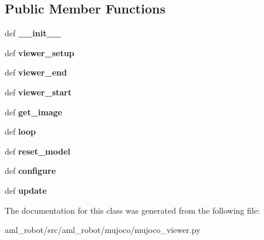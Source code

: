 \subsection*{Public Member Functions}
\begin{DoxyCompactItemize}
\item 
\hypertarget{classaml__robot_1_1mujoco_1_1mujoco__viewer_1_1_mujoco_viewer_abd60a1681f98dd324af2e72e9963d5e0}{def {\bfseries \-\_\-\-\_\-init\-\_\-\-\_\-}}\label{classaml__robot_1_1mujoco_1_1mujoco__viewer_1_1_mujoco_viewer_abd60a1681f98dd324af2e72e9963d5e0}

\item 
\hypertarget{classaml__robot_1_1mujoco_1_1mujoco__viewer_1_1_mujoco_viewer_ab5d6014fe4cac19369aca0a0fc1341b9}{def {\bfseries viewer\-\_\-setup}}\label{classaml__robot_1_1mujoco_1_1mujoco__viewer_1_1_mujoco_viewer_ab5d6014fe4cac19369aca0a0fc1341b9}

\item 
\hypertarget{classaml__robot_1_1mujoco_1_1mujoco__viewer_1_1_mujoco_viewer_a6fd6574d006fa00da91ee7de314f733f}{def {\bfseries viewer\-\_\-end}}\label{classaml__robot_1_1mujoco_1_1mujoco__viewer_1_1_mujoco_viewer_a6fd6574d006fa00da91ee7de314f733f}

\item 
\hypertarget{classaml__robot_1_1mujoco_1_1mujoco__viewer_1_1_mujoco_viewer_aea5aa6b0c0ffa605450bc1b484d6f376}{def {\bfseries viewer\-\_\-start}}\label{classaml__robot_1_1mujoco_1_1mujoco__viewer_1_1_mujoco_viewer_aea5aa6b0c0ffa605450bc1b484d6f376}

\item 
\hypertarget{classaml__robot_1_1mujoco_1_1mujoco__viewer_1_1_mujoco_viewer_a8df8939aa08c9a567c4ab57497482b21}{def {\bfseries get\-\_\-image}}\label{classaml__robot_1_1mujoco_1_1mujoco__viewer_1_1_mujoco_viewer_a8df8939aa08c9a567c4ab57497482b21}

\item 
\hypertarget{classaml__robot_1_1mujoco_1_1mujoco__viewer_1_1_mujoco_viewer_a87bdbcfd8cf3f55828f5ae8f5f27d9fb}{def {\bfseries loop}}\label{classaml__robot_1_1mujoco_1_1mujoco__viewer_1_1_mujoco_viewer_a87bdbcfd8cf3f55828f5ae8f5f27d9fb}

\item 
\hypertarget{classaml__robot_1_1mujoco_1_1mujoco__viewer_1_1_mujoco_viewer_a76bf0d4dacf9e3e5a70e5aa186e0c0c8}{def {\bfseries reset\-\_\-model}}\label{classaml__robot_1_1mujoco_1_1mujoco__viewer_1_1_mujoco_viewer_a76bf0d4dacf9e3e5a70e5aa186e0c0c8}

\item 
\hypertarget{classaml__robot_1_1mujoco_1_1mujoco__viewer_1_1_mujoco_viewer_afa934a8fdb33f0b020f1b6f3c2de72fc}{def {\bfseries configure}}\label{classaml__robot_1_1mujoco_1_1mujoco__viewer_1_1_mujoco_viewer_afa934a8fdb33f0b020f1b6f3c2de72fc}

\item 
\hypertarget{classaml__robot_1_1mujoco_1_1mujoco__viewer_1_1_mujoco_viewer_a5543556824d15d9587806955e6fb6399}{def {\bfseries update}}\label{classaml__robot_1_1mujoco_1_1mujoco__viewer_1_1_mujoco_viewer_a5543556824d15d9587806955e6fb6399}

\end{DoxyCompactItemize}


The documentation for this class was generated from the following file\-:\begin{DoxyCompactItemize}
\item 
aml\-\_\-robot/src/aml\-\_\-robot/mujoco/mujoco\-\_\-viewer.\-py\end{DoxyCompactItemize}
